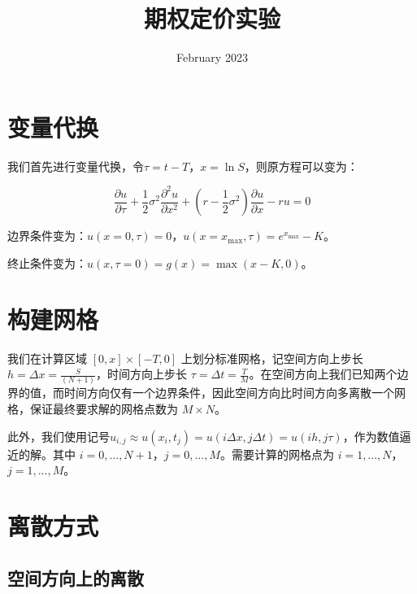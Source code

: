 \documentclass{article}
\title{期权定价实验}
\author{}
\date{February 2023}
\begin{document}
\maketitle


\vspace{2ex}

\section{变量代换}

我们首先进行变量代换，令$\tau = t-T$，$x = \ln S$，则原方程可以变为：

$$\frac{\partial u}{\partial \tau} + \frac{1}{2}\sigma^2\frac{\partial^2 u}{\partial x^2} + (r-\frac{1}{2}\sigma^2)\frac{\partial u}{\partial x} - r u = 0$$

边界条件变为：$u(x=0, \tau) = 0$，$u(x=x_{\max}, \tau) = e^{x_{\max}}-K$。

终止条件变为：$u(x,\tau=0) = g(x) = \max(x-K,0)$。


\section{构建网格}
我们在计算区域 $[0, x] × [-T, 0]$ 上划分标准网格，记空间方向上步长 $h = \Delta x = \frac{S}{(N + 1)}$，时间方向上步长 $\tau = \Delta t = \frac{T}{M}$。在空间方向上我们已知两个边界的值，而时间方向仅有一个边界条件，因此空间方向比时间方向多离散一个网格，保证最终要求解的网格点数为 $M × N$。

此外，我们使用记号$u_{i,j} \approx u(x_i, t_j) = u(i\Delta x, j\Delta t) = u(ih, j\tau)$，作为数值逼近的解。其中 $i = 0,..., N + 1$，$j = 0,..., M$。需要计算的网格点为 $i = 1,..., N$，$j = 1,..., M$。





\section{离散方式}


\subsection{空间方向上的离散}
\end{document}
